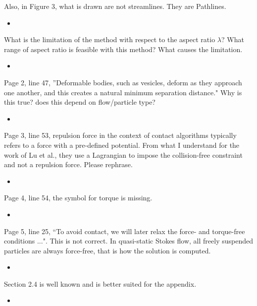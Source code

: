 \documentclass[11pt]{article}
\newcommand{\comment}[1]{{\color{blue} #1}}
\begin{document}
\noindent
\comment{Also, in Figure 3, what is drawn are not streamlines.  They are
Pathlines.}
\begin{itemize}
  \item
\end{itemize}


\noindent
\comment{What is the limitation of the method with respect to the aspect
ratio $\lambda$?  What range of aspect ratio is feasible with this
method?  What causes the limitation.}
\begin{itemize}
  \item
\end{itemize}

\noindent
\comment{Page 2, line 47, ''Deformable bodies, such as vesicles, deform as
they approach one another, and this creates a natural minimum separation
distance." Why is this true?  does this depend on flow/particle type?}
\begin{itemize}
  \item
\end{itemize}

\noindent
\comment{Page 3, line 53, repulsion force in the context of contact
  algorithms typically refers to a force with a pre-defined potential.
  From what I understand for the work of Lu et al., they use a
  Lagrangian to impose the collision-free constraint and not a repulsion
  force.  Please rephrase.}
\begin{itemize}
  \item
\end{itemize}

\noindent
\comment{Page 4, line 54, the symbol for torque is missing.}
\begin{itemize}
  \item
\end{itemize}

\noindent
\comment{Page 5, line 25, ``To avoid contact, we will later relax the
  force- and torque-free conditions ...".  This is not correct.  In
  quasi-static Stokes flow, all freely suspended particles are always
  force-free, that is how the solution is computed.}
\begin{itemize}
  \item
\end{itemize}

\noindent
\comment{Section 2.4 is well known and is better suited for the
appendix.}
\begin{itemize}
  \item
\end{itemize}
\end{document}
